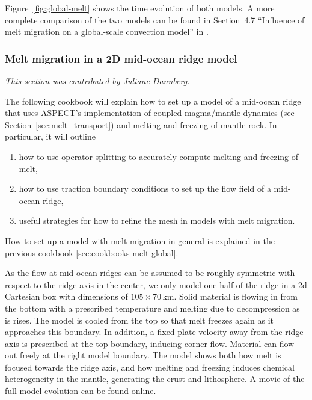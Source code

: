 \documentclass{article}
\newcommand{\aspect}{\textsc{ASPECT}}
\begin{document}
Figure~\ref{fig:global-melt} shows the time evolution of both models. 
A more complete comparison of the two models can be found in Section~4.7 ``Influence of melt migration on a global-scale 
convection model'' in \cite{dannberg_melt}.

\subsubsection{Melt migration in a 2D mid-ocean ridge model}
\label{sec:cookbooks-mid-ocean-ridge}

\textit{This section was contributed by Juliane Dannberg.}

The following cookbook will explain how to set up a model of a mid-ocean ridge that uses \aspect{}'s 
implementation of coupled magma/mantle dynamics (see Section~\ref{sec:melt_transport}) and melting 
and freezing of mantle rock. 
In particular, it will outline 
\begin{enumerate}
  \item how to use operator splitting to accurately compute melting and freezing of melt, 
  \item how to use traction boundary conditions to set up the flow field of a mid-ocean ridge, 
  \item useful strategies for how to refine the mesh in models with melt migration.
\end{enumerate}
How to set up a model with melt migration in general is explained in the previous cookbook \ref{sec:cookbooks-melt-global}. 

As the flow at mid-ocean ridges can be assumed to be roughly symmetric with respect to the ridge axis 
in the center, we only model one half of the ridge in a 2d Cartesian box with dimensions of $105 \times 70$\,km. Solid material is flowing in from the bottom with a prescribed temperature and melting due to decompression as is rises. The model is cooled from the top so that melt freezes again as it approaches this boundary. In addition, a fixed plate velocity away from the ridge axis is prescribed at the top boundary, inducing corner flow. Material can flow out freely at the right model boundary. The model shows both how melt is focused towards the ridge axis, and how melting and freezing induces chemical heterogeneity in the mantle, generating the crust and lithosphere. 
A movie of the full model evolution can be found \href{https://www.youtube.com/watch?v=f4Bc4lzdNP0}{online}. 
\end{document}
